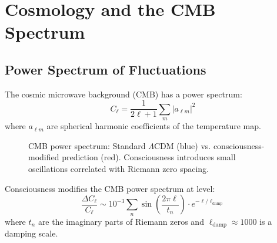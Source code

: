 \section{Cosmology and the CMB Spectrum}

\subsection{Power Spectrum of Fluctuations}

The cosmic microwave background (CMB) has a power spectrum:
\begin{equation}
C_\ell = \frac{1}{2\ell+1} \sum_m |a_{\ell m}|^2
\end{equation}
where $a_{\ell m}$ are spherical harmonic coefficients of the temperature map.

\begin{figure}[h]
\centering
{}
\caption{CMB power spectrum: Standard $\Lambda$CDM (blue) vs. consciousness-modified prediction (red). Consciousness introduces small oscillations correlated with Riemann zero spacing.}
\label{fig:cmb-power-spectrum}
\end{figure}

\begin{theorem}\label{thm:consciousness-cmb}
Consciousness modifies the CMB power spectrum at level:
\begin{equation}
\boxed{\frac{\Delta C_\ell}{C_\ell} \sim 10^{-3} \sum_n \sin\left( \frac{2\pi \ell}{t_n} \right) \cdot e^{-\ell/\ell_{\text{damp}}}}
\end{equation}
where $t_n$ are the imaginary parts of Riemann zeros and $\ell_{\text{damp}} \approx 1000$ is a damping scale.
\end{theorem}

